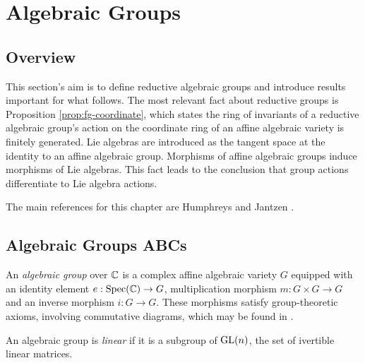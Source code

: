 \chapter{Algebraic Groups}

\section{Overview}
\label{sec:grp-motivation}

This section's aim is to define reductive algebraic groups and introduce results important for what follows. The most relevant fact about reductive groups is Proposition \ref{prop:fg-coordinate}, which states the ring of invariants of a reductive algebraic group's action on the coordinate ring of an affine algebraic variety is finitely generated. Lie algebras are introduced as the tangent space at the identity to an affine algebraic group. Morphisms of affine algebraic groups induce morphisms of Lie algebras. This fact leads to the conclusion that group actions differentiate to Lie algebra actions.

The main references for this chapter are Humphreys \cite{MR0396773} and Jantzen \cite{MR2015057}.

\section{Algebraic Groups ABCs}
\label{sec:basics-of-groups}

\begin{definition}
  An \emph{algebraic group} over $\mathbb{C}$ is a complex affine algebraic variety $G$ equipped with an identity element $e: \operatorname{Spec}(\mathbb{C}) \to G$, multiplication morphism $m : G \times G \to G$ and an inverse morphism $i: G \to G$. These morphisms satisfy group-theoretic axioms, involving commutative diagrams, which may be found in \cite[\S 1a]{milneiAG}.

  An algebraic group is \emph{linear} if it is a subgroup of $\operatorname{GL}(n)$, the set of ivertible linear matrices.
\end{definition}

